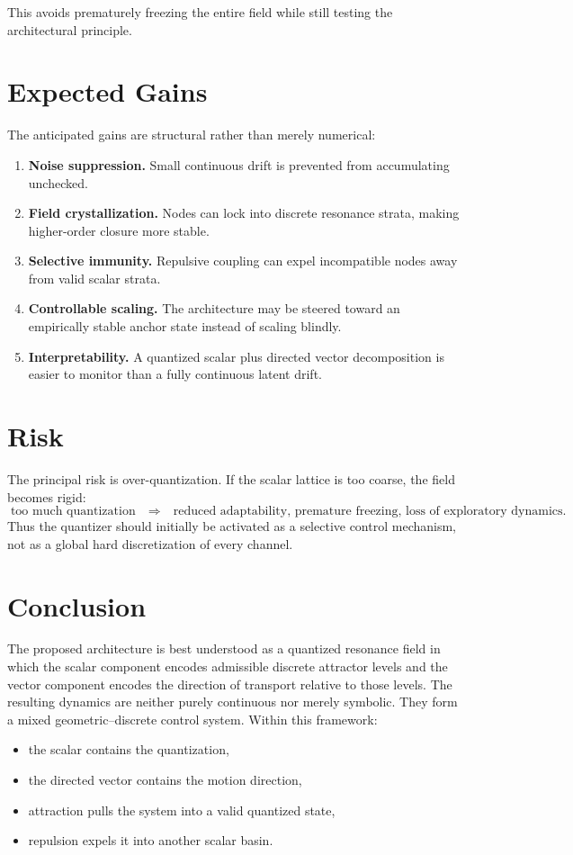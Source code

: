 \documentclass[11pt,a4paper]{article}
\begin{document}
This avoids prematurely freezing the entire field while still testing the
architectural principle.

\section{Expected Gains}
The anticipated gains are structural rather than merely numerical:
\begin{enumerate}[label=\arabic*.]
    \item \textbf{Noise suppression.}
    Small continuous drift is prevented from accumulating unchecked.
    \item \textbf{Field crystallization.}
    Nodes can lock into discrete resonance strata, making higher-order closure
    more stable.
    \item \textbf{Selective immunity.}
    Repulsive coupling can expel incompatible nodes away from valid scalar
    strata.
    \item \textbf{Controllable scaling.}
    The architecture may be steered toward an empirically stable anchor state
    instead of scaling blindly.
    \item \textbf{Interpretability.}
    A quantized scalar plus directed vector decomposition is easier to monitor
    than a fully continuous latent drift.
\end{enumerate}

\section{Risk}
The principal risk is over-quantization. If the scalar lattice is too coarse,
the field becomes rigid:
\[
\text{too much quantization}
\quad\Rightarrow\quad
\text{reduced adaptability, premature freezing, loss of exploratory dynamics.}
\]
Thus the quantizer should initially be activated as a selective control
mechanism, not as a global hard discretization of every channel.

\section{Conclusion}
The proposed architecture is best understood as a quantized resonance field in
which the scalar component encodes admissible discrete attractor levels and the
vector component encodes the direction of transport relative to those levels.
The resulting dynamics are neither purely continuous nor merely symbolic. They
form a mixed geometric--discrete control system. Within this framework:
\begin{itemize}
    \item the scalar contains the quantization,
    \item the directed vector contains the motion direction,
    \item attraction pulls the system into a valid quantized state,
    \item repulsion expels it into another scalar basin.
\end{itemize}
\end{document}
